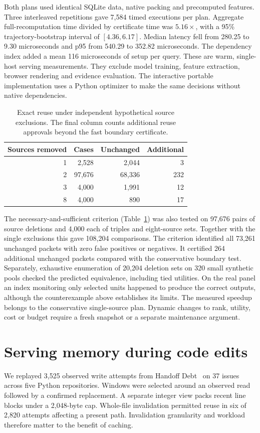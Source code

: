 \documentclass[conference]{IEEEtran}
\begin{document}
Both plans used identical SQLite data, native packing and precomputed features. Three interleaved repetitions gave 7,584 timed executions per plan. Aggregate full-recomputation time divided by certificate time was $5.16\times$, with a 95\% trajectory-bootstrap interval of $[4.36,6.17]$. Median latency fell from 280.25 to 9.30 microseconds and p95 from 540.29 to 352.82 microseconds. The dependency index added a mean 116 microseconds of setup per query. These are warm, single-host serving measurements. They exclude model training, feature extraction, browser rendering and evidence evaluation. The interactive portable implementation uses a Python optimizer to make the same decisions without native dependencies.

\balance
\begin{table}[t]
\caption{Exact reuse under independent hypothetical source exclusions. The final column counts additional reuse approvals beyond the fast boundary certificate.}
\centering\small
\begin{tabular}{rrrr}\toprule
Sources removed & Cases & Unchanged & Additional\\\midrule
1 & 2,528 & 2,044 & 3\\
2 & 97,676 & 68,336 & 232\\
3 & 4,000 & 1,991 & 12\\
8 & 4,000 & 890 & 17\\
\bottomrule\end{tabular}
\label{tab:exclusions}
\end{table}

The necessary-and-sufficient criterion (Table~\ref{tab:exclusions}) was also tested on 97,676 pairs of source deletions and 4,000 each of triples and eight-source sets. Together with the single exclusions this gave 108,204 comparisons. The criterion identified all 73,261 unchanged packets with zero false positives or negatives. It certified 264 additional unchanged packets compared with the conservative boundary test. Separately, exhaustive enumeration of 20,204 deletion sets on 320 small synthetic pools checked the predicted equivalence, including tied utilities. On the real panel an index monitoring only selected units happened to produce the correct outputs, although the counterexample above establishes its limits. The measured speedup belongs to the conservative single-source plan. Dynamic changes to rank, utility, cost or budget require a fresh snapshot or a separate maintenance argument.

\section{Serving memory during code edits}
We replayed 3,525 observed write attempts from Handoff Debt~\cite{handoff} on 37 issues across five Python repositories. Windows were selected around an observed read followed by a confirmed replacement. A separate integer view packs recent line blocks under a 2,048-byte cap. Whole-file invalidation permitted reuse in six of 2,820 attempts affecting a present path. Invalidation granularity and workload therefore matter to the benefit of caching.
\end{document}

